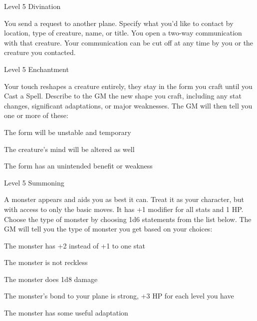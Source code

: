  
\startSpellName
{} 	Level 5	Divination
\stopSpellName
 

You send a request to another plane. Specify what you'd like to contact by location, type of creature, name, or title. You open a two-way communication with that creature. Your communication can be cut off at any time by you or the creature you contacted.

 
\startSpellName
{} 	Level 5	Enchantment
\stopSpellName
 

Your touch reshapes a creature entirely, they stay in the form you craft until you Cast a Spell. Describe to the GM the new shape you craft, including any stat changes, significant adaptations, or major weaknesses. The GM will then tell you one or more of these:

 
\startitemize[1,packed]

\item The form will be unstable and temporary

 
\item The creature's mind will be altered as well

 
\item The form has an unintended benefit or weakness


\stopitemize
 
\startSpellName
{} 	Level 5	Summoning
\stopSpellName
 

A monster appears and aids you as best it can. Treat it as your character, but with access to only the basic moves. It has +1 modifier for all stats and 1 HP. Choose the type of monster by choosing 1d6 statements from the list below. The GM will tell you the type of monster you get based on your choices:

 
\startitemize[1,packed]

\item The monster has +2 instead of +1 to one stat

 
\item The monster is not reckless

 
\item The monster does 1d8 damage

 
\item The monster's bond to your plane is strong, +3 HP for each level you have

 
\item The monster has some useful adaptation


\stopitemize
 

